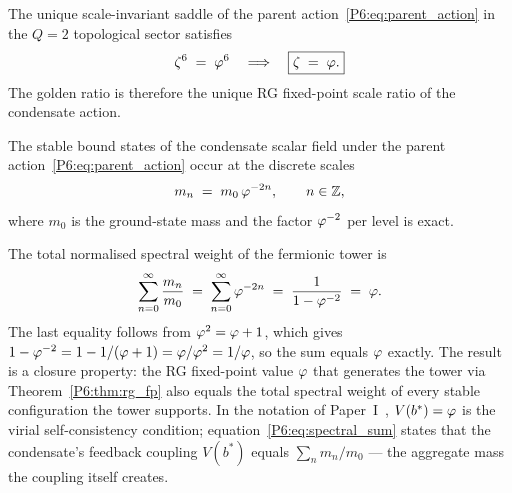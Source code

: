 \begin{theorem}[RG fixed point: $\zeta = \vp$]
\label{P6:thm:rg_fp}
The unique scale-invariant saddle of the parent action~\eqref{P6:eq:parent_action}
in the $Q=2$ topological sector satisfies
\begin{equation}
  \zeta^6 \;=\; \varphi^6
  \quad\Longrightarrow\quad
  \boxed{\zeta \;=\; \varphi.}
  \label{P6:eq:rg_fp}
\end{equation}
The golden ratio is therefore the unique RG fixed-point scale ratio
of the condensate action.
\end{theorem}

\begin{theorem}
\label{P6:thm:tower_quantisation}
The stable bound states of the condensate scalar field under the
parent action~\eqref{P6:eq:parent_action} occur at the discrete
scales
\begin{equation}
  m_n \;=\; m_0\,\varphi^{-2n}, \qquad n \in \mathbb{Z},
  \label{P6:eq:mass_tower}
\end{equation}
where $m_0$ is the ground-state mass and the factor $\varphi^{-2}$ per
level is exact.
\end{theorem}

\begin{remark}
\label{P6:rem:spectral_closure}
The total normalised spectral weight of the fermionic tower is
\begin{equation}
  \sum_{n=0}^{\infty} \frac{m_n}{m_0}
  \;=\; \sum_{n=0}^{\infty} \varphi^{-2n}
  \;=\; \frac{1}{1-\varphi^{-2}} \;=\; \varphi.
  \label{P6:eq:spectral_sum}
\end{equation}
The last equality follows from $\varphi^2 = \varphi+1$, which gives
$1 - \varphi^{-2} = 1 - 1/(\varphi+1) = \varphi/\varphi^2 = 1/\varphi$,
so the sum equals $\varphi$ exactly.
The result is a closure property: the RG fixed-point value $\varphi$
that generates the tower via Theorem~\ref{P6:thm:rg_fp} also equals
the total spectral weight of every stable configuration the tower supports.
In the notation of Paper~I~\cite{Paper1}, $V(b^*) = \varphi$ is the virial
self-consistency condition; equation~\eqref{P6:eq:spectral_sum} states that
the condensate's feedback coupling $V(b^*)$ equals
$\sum_n m_n/m_0$ --- the aggregate mass the coupling itself creates.
\end{remark}

